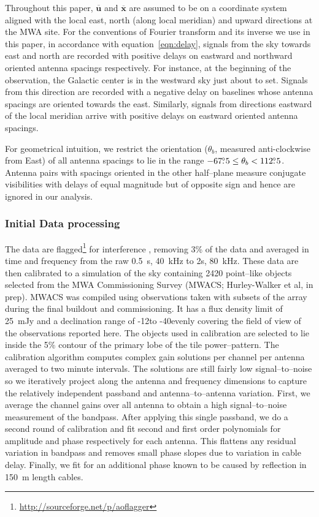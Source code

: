 \documentclass[preprint2,iop,numberedappendix]{emulateapj}
\begin{document}
Throughout this paper, $\overline{\mathbf{u}}$ and $\overline{\mathbf{x}}$ are assumed to be on a coordinate system aligned with the local east, north (along local meridian) and upward directions at the MWA site. For the conventions of Fourier transform and its inverse we use in this paper, in accordance with equation~\ref{eqn:delay}, signals from the sky towards east and north are recorded with positive delays on eastward and northward oriented antenna spacings respectively. For instance, at the beginning of the observation, the Galactic center is in the westward sky just about to set. Signals from this direction are recorded with a negative delay on baselines whose antenna spacings are oriented towards the east. Similarly, signals from directions eastward of the local meridian arrive with positive delays on eastward oriented antenna spacings. 

For geometrical intuition, we restrict the orientation ($\theta_b$, measured anti-clockwise from East) of all antenna spacings to lie in the range $-67\mbox{$.\!\!^\circ$} 5 \leq \theta_b < 112\mbox{$.\!\!^\circ$} 5$. Antenna pairs with spacings oriented in the other half--plane measure conjugate visibilities with delays of equal magnitude but of opposite sign and hence are ignored in our analysis.

\subsubsection{Initial Data processing}\label{sec:data-analysis}

The data are flagged\footnote{\url{http://sourceforge.net/p/aoflagger}} for interference \citep{off12,off10}, removing 3\% of the data and averaged in time  and frequency from the raw 0.5~s, 40~kHz to 2s, 80~kHz. These data are then calibrated to a simulation of the sky containing 2420 point--like objects selected from the MWA Commissioning Survey (MWACS; Hurley-Walker et al, in prep). MWACS was compiled using observations taken with subsets of the array during the final buildout and commissioning. It has a flux density limit of 25~mJy and a declination range of -12\arcdeg to -40\arcdeg evenly covering the field of view of the observations reported here. The objects used in calibration are selected to lie inside the 5\% contour of the primary lobe of the tile power--pattern. The calibration algorithm \citep{sul12} computes complex gain solutions per channel per antenna averaged to two minute intervals. The solutions are still fairly low signal--to--noise so we iteratively project along the antenna and frequency dimensions to capture the relatively independent passband and antenna--to--antenna variation. First, we average the channel gains over all antenna to obtain a high signal--to--noise measurement of the bandpass. After applying this single passband, we do a second round of calibration and fit second and first order polynomials for amplitude and phase respectively for each antenna. This flattens any residual variation in bandpass and removes small phase slopes due to variation in cable delay. Finally, we fit for an additional phase known to be caused by reflection in 150~m length cables. %
\end{document}
